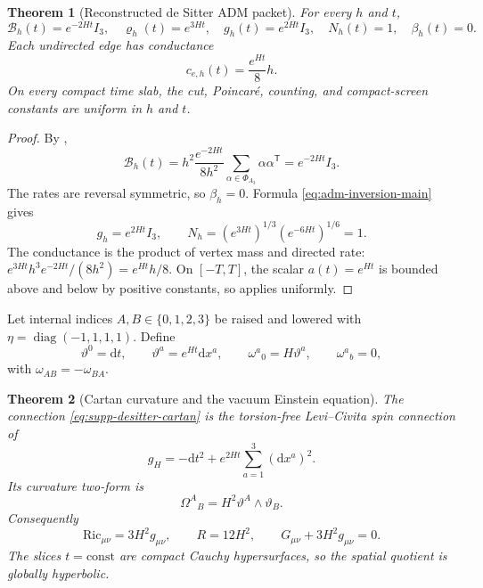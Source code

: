 \documentclass[11pt]{article}
\newtheorem{theorem}{Theorem}[section]
\theoremstyle{definition}
\theoremstyle{remark}
\newcommand{\dd}{\mathrm d}
\newcommand{\diag}{\operatorname{diag}}
\newcommand{\Ric}{\mathrm{Ric}}
\begin{document}
\begin{theorem}[Reconstructed de Sitter ADM packet]
\label{thm:supp-desitter-adm}
For every $h$ and $t$,
\begin{equation}
 \boxed{
 \mathcal B_h(t)=e^{-2Ht}I_3,
 \quad
 \varrho_h(t)=e^{3Ht},
 \quad
 g_h(t)=e^{2Ht}I_3,
 \quad
 N_h(t)=1,
 \quad
 \beta_h(t)=0.}
 \label{eq:supp-desitter-adm}
\end{equation}
Each undirected edge has conductance
\begin{equation}
 \boxed{c_{e,h}(t)=\frac{e^{Ht}}8h.}
 \label{eq:supp-desitter-conductance}
\end{equation}
On every compact time slab, the cut, Poincar\'e, counting, and compact-screen
constants are uniform in $h$ and $t$.
\end{theorem}

\begin{proof}
By ,
\[
 \mathcal B_h(t)
 =h^2\frac{e^{-2Ht}}{8h^2}
  \sum_{\alpha\in\Phi_{A_3}}\alpha\alpha^{\mathsf T}
 =e^{-2Ht}I_3.
\]
The rates are reversal symmetric, so $\beta_h=0$.  Formula
\eqref{eq:adm-inversion-main} gives
\[
 g_h=e^{2Ht}I_3,
 \qquad
 N_h=(e^{3Ht})^{1/3}(e^{-6Ht})^{1/6}=1.
\]
The conductance is the product of vertex mass and directed rate:
$e^{3Ht}h^3e^{-2Ht}/(8h^2)=e^{Ht}h/8$.  On $[-T,T]$, the scalar
$a(t)=e^{Ht}$ is bounded above and below by positive constants, so
 applies uniformly.
\end{proof}

Let internal indices $A,B\in\{0,1,2,3\}$ be raised and lowered with
$\eta=\diag(-1,1,1,1)$.  Define
\begin{equation}
 \vartheta^0=\dd t,
 \qquad
 \vartheta^a=e^{Ht}\dd x^a,
 \qquad
 \omega^a{}_0=H\vartheta^a,
 \qquad
 \omega^a{}_b=0,
 \label{eq:supp-desitter-cartan}
\end{equation}
with $\omega_{AB}=-\omega_{BA}$.

\begin{theorem}[Cartan curvature and the vacuum Einstein equation]
\label{thm:supp-desitter-einstein}
The connection \eqref{eq:supp-desitter-cartan} is the torsion-free
Levi--Civita spin connection of
\begin{equation}
 g_H=-\dd t^2+e^{2Ht}\sum_{a=1}^3(\dd x^a)^2.
 \label{eq:supp-desitter-metric}
\end{equation}
Its curvature two-form is
\begin{equation}
 \boxed{\Omega^A{}_B=H^2\vartheta^A\wedge\vartheta_B.}
 \label{eq:supp-desitter-curvature}
\end{equation}
Consequently
\begin{equation}
 \Ric_{\mu\nu}=3H^2g_{\mu\nu},
 \qquad
 R=12H^2,
 \qquad
 \boxed{G_{\mu\nu}+3H^2g_{\mu\nu}=0.}
 \label{eq:supp-desitter-einstein}
\end{equation}
The slices $t=\mathrm{const}$ are compact Cauchy hypersurfaces, so the spatial
quotient is globally hyperbolic.
\end{theorem}
\end{document}
